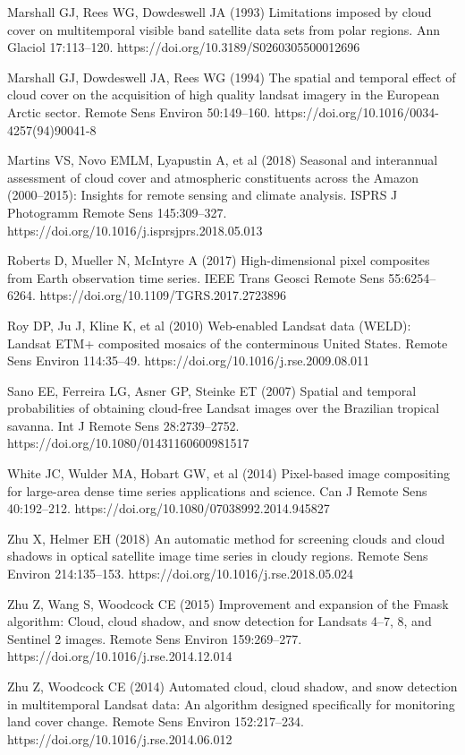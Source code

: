 \documentclass[
  letterpaper,
  DIV=11,
  numbers=noendperiod]{scrreprt}
\begin{document}
Marshall GJ, Rees WG, Dowdeswell JA (1993) Limitations imposed by cloud
cover on multitemporal visible band satellite data sets from polar
regions. Ann Glaciol 17:113--120.
https://doi.org/10.3189/S0260305500012696

Marshall GJ, Dowdeswell JA, Rees WG (1994) The spatial and temporal
effect of cloud cover on the acquisition of high quality landsat imagery
in the European Arctic sector. Remote Sens Environ 50:149--160.
https://doi.org/10.1016/0034-4257(94)90041-8

Martins VS, Novo EMLM, Lyapustin A, et al (2018) Seasonal and
interannual assessment of cloud cover and atmospheric constituents
across the Amazon (2000--2015): Insights for remote sensing and climate
analysis. ISPRS J Photogramm Remote Sens 145:309--327.
https://doi.org/10.1016/j.isprsjprs.2018.05.013

Roberts D, Mueller N, McIntyre A (2017) High-dimensional pixel
composites from Earth observation time series. IEEE Trans Geosci Remote
Sens 55:6254--6264. https://doi.org/10.1109/TGRS.2017.2723896

Roy DP, Ju J, Kline K, et al (2010) Web-enabled Landsat data (WELD):
Landsat ETM+ composited mosaics of the conterminous United States.
Remote Sens Environ 114:35--49.
https://doi.org/10.1016/j.rse.2009.08.011

Sano EE, Ferreira LG, Asner GP, Steinke ET (2007) Spatial and temporal
probabilities of obtaining cloud-free Landsat images over the Brazilian
tropical savanna. Int J Remote Sens 28:2739--2752.
https://doi.org/10.1080/01431160600981517

White JC, Wulder MA, Hobart GW, et al (2014) Pixel-based image
compositing for large-area dense time series applications and science.
Can J Remote Sens 40:192--212.
https://doi.org/10.1080/07038992.2014.945827

Zhu X, Helmer EH (2018) An automatic method for screening clouds and
cloud shadows in optical satellite image time series in cloudy regions.
Remote Sens Environ 214:135--153.
https://doi.org/10.1016/j.rse.2018.05.024

Zhu Z, Wang S, Woodcock CE (2015) Improvement and expansion of the Fmask
algorithm: Cloud, cloud shadow, and snow detection for Landsats 4--7, 8,
and Sentinel 2 images. Remote Sens Environ 159:269--277.
https://doi.org/10.1016/j.rse.2014.12.014

Zhu Z, Woodcock CE (2014) Automated cloud, cloud shadow, and snow
detection in multitemporal Landsat data: An algorithm designed
specifically for monitoring land cover change. Remote Sens Environ
152:217--234. https://doi.org/10.1016/j.rse.2014.06.012
\end{document}
